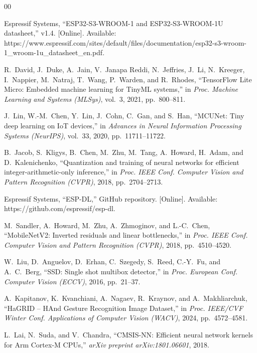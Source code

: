\documentclass[conference]{IEEEtran}
\begin{document}
	\begin{thebibliography}{00}
		
		Espressif Systems, ``ESP32-S3-WROOM-1 and ESP32-S3-WROOM-1U datasheet,'' v1.4. [Online]. Available: https://www.espressif.com/sites/default/files/documentation/esp32-s3-wroom-1\_wroom-1u\_datasheet\_en.pdf.
		
		R.~David, J.~Duke, A.~Jain, V.~Janapa Reddi, N.~Jeffries, J.~Li, N.~Kreeger, I.~Nappier,
		M.~Natraj, T.~Wang, P.~Warden, and R.~Rhodes, ``TensorFlow Lite Micro: Embedded machine
		learning for TinyML systems,'' in \emph{Proc. Machine Learning and Systems (MLSys)}, vol.~3,
		2021, pp.~800--811.
		
		J.~Lin, W.-M.~Chen, Y.~Lin, J.~Cohn, C.~Gan, and S.~Han, ``MCUNet: Tiny deep learning on IoT
		devices,'' in \emph{Advances in Neural Information Processing Systems (NeurIPS)}, vol.~33,
		2020, pp.~11711--11722.
		
		B.~Jacob, S.~Kligys, B.~Chen, M.~Zhu, M.~Tang, A.~Howard, H.~Adam, and D.~Kalenichenko,
		``Quantization and training of neural networks for efficient integer-arithmetic-only
		inference,'' in \emph{Proc. IEEE Conf. Computer Vision and Pattern Recognition (CVPR)}, 2018,
		pp.~2704--2713.
		
		Espressif Systems, ``ESP-DL,'' GitHub repository. [Online]. Available: https://github.com/espressif/esp-dl.
		
		M.~Sandler, A.~Howard, M.~Zhu, A.~Zhmoginov, and L.-C.~Chen, ``MobileNetV2: Inverted residuals
		and linear bottlenecks,'' in \emph{Proc. IEEE Conf. Computer Vision and Pattern Recognition
			(CVPR)}, 2018, pp.~4510--4520.
		
		W.~Liu, D.~Anguelov, D.~Erhan, C.~Szegedy, S.~Reed, C.-Y.~Fu, and A.~C.~Berg, ``SSD: Single
		shot multibox detector,'' in \emph{Proc. European Conf. Computer Vision (ECCV)}, 2016,
		pp.~21--37.
		
		A.~Kapitanov, K.~Kvanchiani, A.~Nagaev, R.~Kraynov, and A.~Makhliarchuk, ``HaGRID -- HAnd
		Gesture Recognition Image Dataset,'' in \emph{Proc. IEEE/CVF Winter Conf. Applications of
			Computer Vision (WACV)}, 2024, pp.~4572--4581.
		
		L.~Lai, N.~Suda, and V.~Chandra, ``CMSIS-NN: Efficient neural network kernels for Arm
		Cortex-M CPUs,'' \emph{arXiv preprint arXiv:1801.06601}, 2018.
		

\end{thebibliography}
\end{document}
